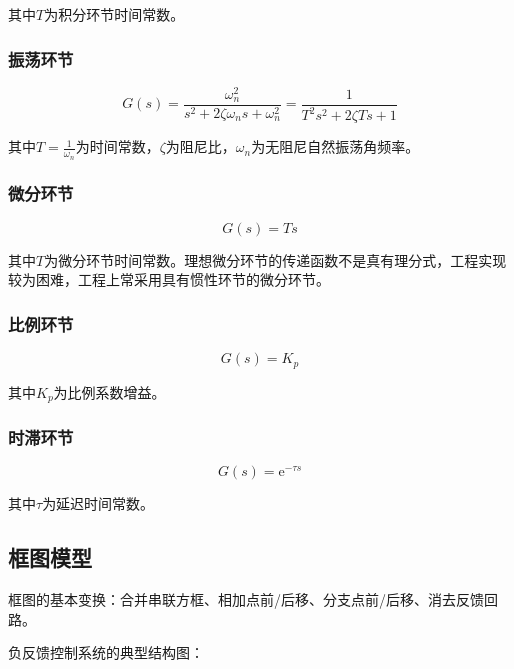 \documentclass[cn, blue, normal, 12pt]{elegantnote}
\begin{document}
其中$T$为积分环节时间常数。

\subsubsection{振荡环节}

\begin{equation}
    G(s)=\frac{\omega_n^2}{s^2+2\zeta\omega_n s+\omega_n^2}=\frac{1}{T^2 s^2+2\zeta Ts+1}
\end{equation}

其中$T=\frac{1}{\omega_n}$为时间常数，$\zeta$为阻尼比，$\omega_n$为无阻尼自然振荡角频率。

\subsubsection{微分环节}

\begin{equation}
    G(s)=Ts
\end{equation}

其中$T$为微分环节时间常数。理想微分环节的传递函数不是真有理分式，工程实现较为困难，工程上常采用具有惯性环节的微分环节。

\subsubsection{比例环节}

\begin{equation}
    G(s)=K_p
\end{equation}

其中$K_p$为比例系数增益。

\subsubsection{时滞环节}

\begin{equation}
    G(s)=\text{e}^{-\tau s}
\end{equation}

其中$\tau$为延迟时间常数。

\subsection{框图模型}

框图的基本变换：合并串联方框、相加点前/后移、分支点前/后移、消去反馈回路。

负反馈控制系统的典型结构图：
\end{document}
